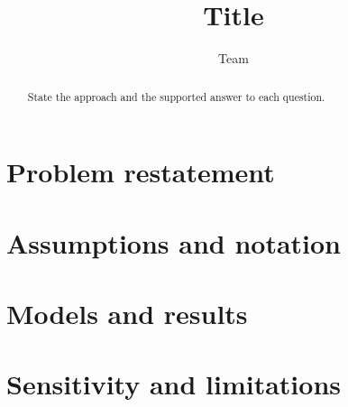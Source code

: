 \documentclass[12pt]{article}
\title{Title}
\author{Team}
\date{}
\begin{document}
\maketitle

\begin{abstract}
State the approach and the supported answer to each question.
\end{abstract}

\section{Problem restatement}
\section{Assumptions and notation}
\section{Models and results}
\section{Sensitivity and limitations}

% 
% 
\end{document}
